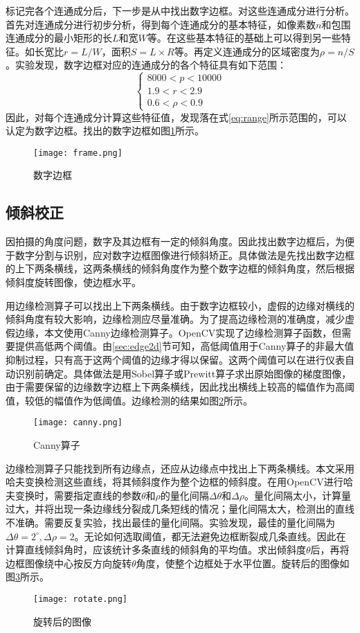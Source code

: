标记完各个连通成分后，下一步是从中找出数字边框。对这些连通成分进行分析。首先对连通成分进行初步分析，得到每个连通成分的基本特征，如像素数$n$和包围连通成分的最小矩形的长$L$和宽$W$等。在这些基本特征的基础上可以得到另一些特征。如长宽比$r=L/W$，面积$S=L\times R$等。再定义连通成分的区域密度为$\rho=n/S$。实验发现，数字边框对应的连通成分的各个特征具有如下范围：
\begin{equation}
  \label{eq:range}
  \begin{cases}
    8000  <  p  <  10000 \\
1.9  <  r  <  2.9 \\
0.6  <  \rho  < 0.9 
  \end{cases}
\end{equation}
因此，对每个连通成分计算这些特征值，发现落在式\eqref{eq:range}所示范围的，可以认定为数字边框。找出的数字边框如图\ref{eq:frame}所示。
\begin{figure}[h]
  \centering
  \texttt{[image: frame.png]}
  \caption{数字边框}
  \label{eq:frame}
\end{figure}

\subsection{倾斜校正}

因拍摄的角度问题，数字及其边框有一定的倾斜角度。因此找出数字边框后，为便于数字分割与识别，应对数字边框图像进行倾斜矫正。具体做法是先找出数字边框的上下两条横线，这两条横线的倾斜角度作为整个数字边框的倾斜角度，然后根据倾斜度旋转图像，使边框水平。

用边缘检测算子可以找出上下两条横线。由于数字边框较小，虚假的边缘对横线的倾斜角度有较大影响，边缘检测应尽量准确。为了提高边缘检测的准确度，减少虚假边缘，本文使用Canny边缘检测算子。OpenCV实现了边缘检测算子函数，但需要提供高低两个阈值。由\ref{sec:edge2d}节可知，高低阈值用于Canny算子的非最大值抑制过程，只有高于这两个阈值的边缘才得以保留。这两个阈值可以在进行仪表自动识别前确定。具体做法是用Sobel算子或Prewitt算子求出原始图像的梯度图像，由于需要保留的边缘数字边框上下两条横线，因此找出横线上较高的幅值作为高阈值，较低的幅值作为低阈值。边缘检测的结果如图\ref{fig:canny}所示。
\begin{figure}[h]
  \centering
  \texttt{[image: canny.png]}
  \caption{Canny算子}
  \label{fig:canny}
\end{figure}

边缘检测算子只能找到所有边缘点，还应从边缘点中找出上下两条横线。本文采用哈夫变换检测这些直线，将其倾斜度作为整个边框的倾斜度。在用OpenCV进行哈夫变换时，需要指定直线的参数$\theta$和$\rho$的量化间隔$\Delta\theta$和$\Delta\rho$。量化间隔太小，计算量过大，并将出现一条边缘线分裂成几条短线的情况；量化间隔太大，检测出的直线不准确。需要反复实验，找出最佳的量化间隔。实验发现，最佳的量化间隔为$\Delta\theta=2^\circ,\Delta\rho=2$。无论如何选取阈值，都无法避免边框断裂成几条直线。因此在计算直线倾斜角时，应该统计多条直线的倾斜角的平均值。求出倾斜度$\theta$后，再将边框图像绕中心按反方向旋转$\theta$角度，使整个边框处于水平位置。旋转后的图像如图\ref{fig:rotate}所示。
\begin{figure}[h]
  \centering
  \texttt{[image: rotate.png]}
  \caption{旋转后的图像}
  \label{fig:rotate}
\end{figure}

